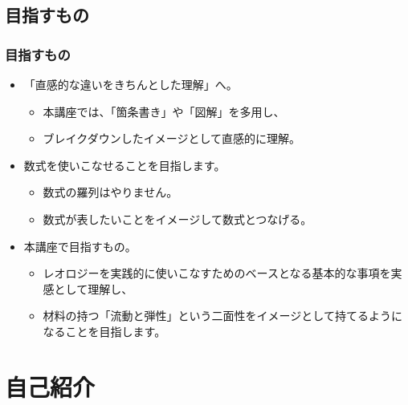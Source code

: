 \documentclass[12pt, dvipdfmx]{beamer}
\begin{document}
\subsection{目指すもの}
\begin{frame}
	\frametitle{目指すもの}
		\begin{itemize}
			\item 「直感的な違いをきちんとした理解」へ。
			\begin{itemize}
				\item 本講座では、「箇条書き」や「図解」を多用し、
				\item ブレイクダウンしたイメージとして直感的に理解。
			\end{itemize}
			\item 数式を使いこなせることを目指します。
			\begin{itemize}
				\item 数式の羅列はやりません。
				\item 数式が表したいことをイメージして数式とつなげる。
			\end{itemize}
			\item 本講座で目指すもの。
			\begin{itemize}
				\item レオロジーを実践的に使いこなすためのベースとなる基本的な事項を実感として理解し、
				\item 材料の持つ「流動と弾性」という二面性をイメージとして持てるようになることを目指します。
			\end{itemize}
		\end{itemize}
\end{frame}

\section{自己紹介}
\end{document}
